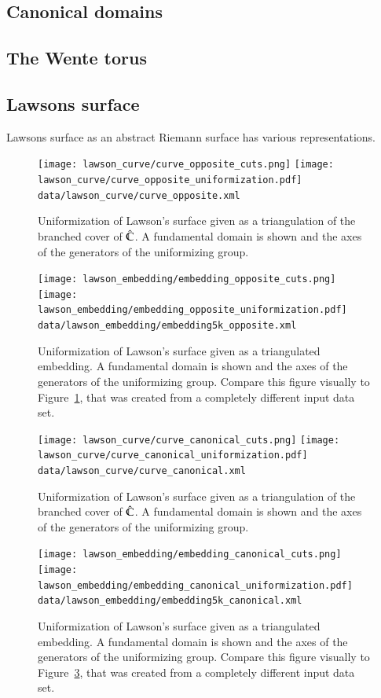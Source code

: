 \documentclass[Thesis.tex]{subfiles}
\begin{document}
\subsection{Canonical domains}
\subsection{The Wente torus}
\subsection{Lawsons surface}

Lawsons surface as an abstract Riemann surface has various representations. 

\begin{figure}
\centering
\texttt{[image: lawson\_curve/curve\_opposite\_cuts.png]}
\texttt{[image: lawson\_curve/curve\_opposite\_uniformization.pdf]}
{\scriptsize\tt data/lawson\_curve/curve\_opposite.xml}
\caption{Uniformization of Lawson's surface given as a triangulation of the
branched cover of $\hat{\mathbb C}$. A fundamental domain is shown and the axes of the
generators of the uniformizing group.} 
\label{fig:lawson_curve_opposite}
\end{figure}


\begin{figure}
\centering
\texttt{[image: lawson\_embedding/embedding\_opposite\_cuts.png]}
\texttt{[image: lawson\_embedding/embedding\_opposite\_uniformization.pdf]}
{\scriptsize\tt data/lawson\_embedding/embedding5k\_opposite.xml}
\caption{Uniformization of Lawson's surface given as a triangulated embedding.
A fundamental domain is shown and the axes of the generators of the
uniformizing group. Compare this figure visually to
Figure~\ref{fig:lawson_curve_opposite}, that was created from a completely
different input data set.} 
\label{fig:lawson_embedding_opposite}
\end{figure}

\begin{figure}
\centering
\texttt{[image: lawson\_curve/curve\_canonical\_cuts.png]}
\texttt{[image: lawson\_curve/curve\_canonical\_uniformization.pdf]}
{\scriptsize\tt data/lawson\_curve/curve\_canonical.xml}
\caption{Uniformization of Lawson's surface given as a triangulation of the
branched cover of $\hat{\mathbb C}$. A fundamental domain is shown and the axes of the
generators of the uniformizing group.} 
\label{fig:lawson_curve_canonical}
\end{figure}


\begin{figure} 
\centering
\texttt{[image: lawson\_embedding/embedding\_canonical\_cuts.png]}
\texttt{[image: lawson\_embedding/embedding\_canonical\_uniformization.pdf]}
{\scriptsize\tt data/lawson\_embedding/embedding5k\_canonical.xml}
\caption{Uniformization of Lawson's surface given as a triangulated embedding.
A fundamental domain is shown and the axes of the generators of the
uniformizing group. Compare this figure visually to
Figure~\ref{fig:lawson_curve_canonical}, that was created from a completely
different input data set.} 
\label{fig:lawson_embedding_canonical}
\end{figure}
\end{document}
